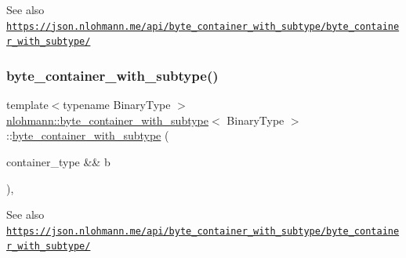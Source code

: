 \begin{DoxySeeAlso}{See also}
\href{https://json.nlohmann.me/api/byte_container_with_subtype/byte_container_with_subtype/}{\tt https\+://json.\+nlohmann.\+me/api/byte\+\_\+container\+\_\+with\+\_\+subtype/byte\+\_\+container\+\_\+with\+\_\+subtype/} 
\end{DoxySeeAlso}
\mbox{\label{classnlohmann_1_1byte__container__with__subtype_a73dcae1798eab1b496936bfae7b4b9c0}} 
\subsubsection{\texorpdfstring{byte\+\_\+container\+\_\+with\+\_\+subtype()}{byte\_container\_with\_subtype()}\hspace{0.1cm}{\footnotesize\ttfamily [3/5]}}
{\footnotesize\ttfamily template$<$typename Binary\+Type $>$ \\
\hyperlink{classnlohmann_1_1byte__container__with__subtype}{nlohmann\+::byte\+\_\+container\+\_\+with\+\_\+subtype}$<$ Binary\+Type $>$\+::\hyperlink{classnlohmann_1_1byte__container__with__subtype}{byte\+\_\+container\+\_\+with\+\_\+subtype} (\begin{DoxyParamCaption}\item[{container\+\_\+type \&\&}]{b }\end{DoxyParamCaption})\hspace{0.3cm}{\ttfamily [inline]}, {\ttfamily [noexcept]}}

\begin{DoxySeeAlso}{See also}
\href{https://json.nlohmann.me/api/byte_container_with_subtype/byte_container_with_subtype/}{\tt https\+://json.\+nlohmann.\+me/api/byte\+\_\+container\+\_\+with\+\_\+subtype/byte\+\_\+container\+\_\+with\+\_\+subtype/} 
\end{DoxySeeAlso}
\mbox{\label{classnlohmann_1_1byte__container__with__subtype_a3c0a82d77668f384bce05c6ec4537cfe}} 
